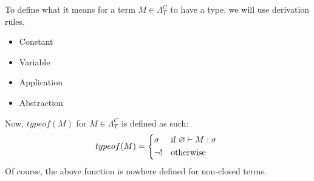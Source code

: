 \documentclass[main.tex]{subfiles}
\begin{document}
\begin{defn}
    To define what it means for a term $M \in \Lambda_T^C$ to have a type,
    we will use derivation rules.
    \begin{itemize}
        \item Constant
        \item Variable
        \item Application
        \item Abstraction
    \end{itemize}

    Now, $typeof(M)$ for $M \in \Lambda_T^C$ is defined as such:
    \[
        typeof(M) =
        \begin{cases*}
            \sigma & if $\varnothing \vdash M : \sigma$ \\
            \neg ! & otherwise
        \end{cases*}
    \]
    Of course, the above function is nowhere defined for non-closed terms.
\end{defn}
\end{document}
